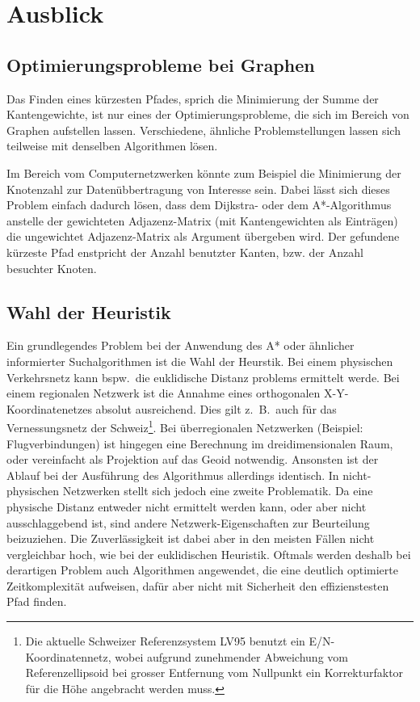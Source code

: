 \section{Ausblick}
\subsection{Optimierungsprobleme bei Graphen}
Das Finden eines kürzesten Pfades, sprich die Minimierung der Summe der Kantengewichte, ist nur eines der Optimierungsprobleme, die sich im Bereich von Graphen aufstellen lassen.
Verschiedene, ähnliche Problemstellungen lassen sich teilweise mit denselben Algorithmen lösen.

Im Bereich vom Computernetzwerken könnte zum Beispiel die Minimierung der Knotenzahl zur Datenübbertragung von Interesse sein.
Dabei lässt sich dieses Problem einfach dadurch lösen, dass dem Dijkstra- oder dem A*-Algorithmus anstelle der gewichteten Adjazenz-Matrix (mit Kantengewichten als Einträgen) die ungewichtet Adjazenz-Matrix als Argument übergeben wird.
Der gefundene kürzeste Pfad enstpricht der Anzahl benutzter Kanten, bzw. der Anzahl besuchter Knoten.  

\subsection{Wahl der Heuristik}
Ein grundlegendes Problem bei der Anwendung des A* oder ähnlicher informierter Suchalgorithmen ist die Wahl der Heurstik.
Bei einem physischen Verkehrsnetz kann bspw.~die euklidische Distanz problems ermittelt werde.
Bei einem regionalen Netzwerk ist die Annahme eines orthogonalen X-Y-Koordinatenetzes absolut ausreichend.
Dies gilt z.~B.~auch für das Vernessungsnetz der Schweiz\footnote{Die aktuelle Schweizer Referenzsystem LV95 benutzt ein E/N-Koordinatennetz, wobei aufgrund zunehmender Abweichung vom Referenzellipsoid bei grosser Entfernung vom Nullpunkt ein Korrekturfaktor für die Höhe angebracht werden muss.}.
Bei überregionalen Netzwerken (Beispiel: Flugverbindungen) ist hingegen eine Berechnung im dreidimensionalen Raum, oder vereinfacht als Projektion auf das Geoid notwendig.
Ansonsten ist der Ablauf bei der Ausführung des Algorithmus allerdings identisch.
In nicht-physischen Netzwerken stellt sich jedoch eine zweite Problematik.
Da eine physische Distanz entweder nicht ermittelt werden kann, oder aber nicht ausschlaggebend ist, sind andere Netzwerk-Eigenschaften zur Beurteilung beizuziehen.
Die Zuverlässigkeit ist dabei aber in den meisten Fällen nicht vergleichbar hoch, wie bei der euklidischen Heuristik.
Oftmals werden deshalb bei derartigen Problem auch Algorithmen angewendet, die eine deutlich optimierte Zeitkomplexität aufweisen, dafür aber nicht mit Sicherheit den effizienstesten Pfad finden.
